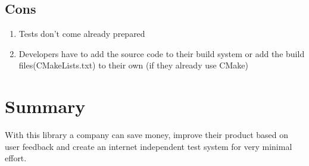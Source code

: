 \subsection{Cons}
\begin{enumerate}
	\item Tests don't come already prepared
	\item Developers have to add the source code to their build system or add the build files(CMakeLists.txt) to their own (if they already use CMake)
\end{enumerate}
\section{Summary}
With this library a company can save money, improve their product based on user feedback and create an internet independent test system for very minimal effort.